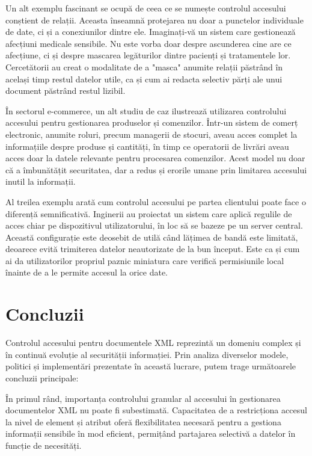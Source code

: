\documentclass[runningheads]{llncs}
\begin{document}
\begin{spacing}{1.5}
Un alt exemplu fascinant se ocupă de ceea ce se numește controlul accesului conștient de relații. Aceasta înseamnă protejarea nu doar a punctelor individuale de date, ci și a conexiunilor dintre ele. Imaginați-vă un sistem care gestionează afecțiuni medicale sensibile. Nu este vorba doar despre ascunderea cine are ce afecțiune, ci și despre mascarea legăturilor dintre pacienți și tratamentele lor. Cercetătorii au creat o modalitate de a "masca" anumite relații păstrând în același timp restul datelor utile, ca și cum ai redacta selectiv părți ale unui document păstrând restul lizibil.

În sectorul e-commerce, un alt studiu de caz ilustrează utilizarea controlului accesului pentru gestionarea produselor și comenzilor. Într-un sistem de comerț electronic, anumite roluri, precum managerii de stocuri, aveau acces complet la informațiile despre produse și cantități, în timp ce operatorii de livrări aveau acces doar la datele relevante pentru procesarea comenzilor. Acest model nu doar că a îmbunătățit securitatea, dar a redus și erorile umane prin limitarea accesului inutil la informații.

Al treilea exemplu arată cum controlul accesului pe partea clientului poate face o diferență semnificativă. Inginerii au proiectat un sistem care aplică regulile de acces chiar pe dispozitivul utilizatorului, în loc să se bazeze pe un server central. Această configurație este deosebit de utilă când lățimea de bandă este limitată, deoarece evită trimiterea datelor neautorizate de la bun început. Este ca și cum ai da utilizatorilor propriul paznic miniatura care verifică permisiunile local înainte de a le permite accesul la orice date.

\section{Concluzii}
Controlul accesului pentru documentele XML reprezintă un domeniu complex și în continuă evoluție al securității informației. Prin analiza diverselor modele, politici și implementări prezentate în această lucrare, putem trage următoarele concluzii principale:

În primul rând, importanța controlului granular al accesului în gestionarea documentelor XML nu poate fi subestimată. Capacitatea de a restricționa accesul la nivel de element și atribut oferă flexibilitatea necesară pentru a gestiona informații sensibile în mod eficient, permițând partajarea selectivă a datelor în funcție de necesități.


\end{spacing}
\end{document}
